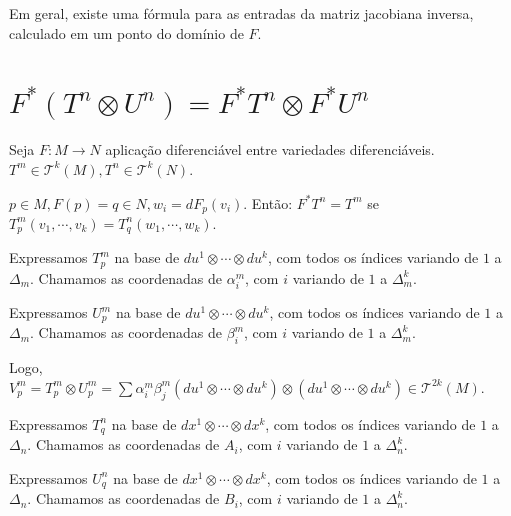 \documentclass[10pt,a4paper]{article}
\begin{document}
		Em geral, existe uma f\'ormula para as entradas da matriz jacobiana inversa, calculado em um ponto do dom\'inio de $F$.

	\section{$F^* (T^n \otimes U^n) = F^* T^n \otimes F^* U^n$}
		\begin{flushright}
		\end{flushright}

		Seja $F: M \rightarrow N$ aplica\c{c}\~ao diferenci\'avel entre variedades diferenci\'aveis.  $T^m \in \mathcal{T}^k(M), T^n \in \mathcal{T}^k(N)$.

		$p \in M, F(p) = q \in N, w_i = dF_p (v_i)$. Ent\~ao: $F^* T^n = T^m$ se $T^m_p (v_1, \cdots, v_k) = T_q^n (w_1, \cdots, w_k)$.

		\vspace{3mm}

		Expressamos $T_p^m$ na base de $du^1 \otimes \cdots \otimes du^k$, com todos os \'indices variando de $1$ a $\Delta_m$. Chamamos as coordenadas de $\alpha_i^m$, com $i$ variando de $1$ a $\Delta_m^k$.

		\vspace{3mm}

		Expressamos $U_p^m$ na base de $du^1 \otimes \cdots \otimes du^k$, com todos os \'indices variando de $1$ a $\Delta_m$. Chamamos as coordenadas de $\beta_i^m$, com $i$ variando de $1$ a $\Delta_m^k$.

		\vspace{3mm}

		Logo, $V_p^m = T_p^m \otimes U_p^m = \sum \alpha_i^m \beta_j^m (du^1 \otimes \cdots \otimes du^k) \otimes (du^1 \otimes \cdots \otimes du^k) \in \mathcal{T}^{2k}(M)$.

		\vspace{3mm}

		Expressamos $T_q^n$ na base de $dx^1 \otimes \cdots \otimes dx^k$, com todos os \'indices variando de $1$ a $\Delta_n$. Chamamos as coordenadas de $A_i$, com $i$ variando de $1$ a $\Delta_n^k$.

		\vspace{3mm}

		Expressamos $U_q^n$ na base de $dx^1 \otimes \cdots \otimes dx^k$, com todos os \'indices variando de $1$ a $\Delta_n$. Chamamos as coordenadas de $B_i$, com $i$ variando de $1$ a $\Delta_n^k$.

		\vspace{3mm}
\end{document}
